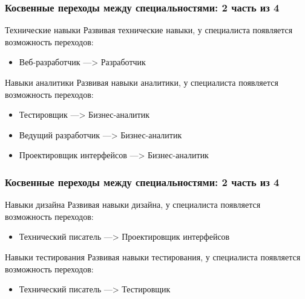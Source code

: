 \documentclass{../industrial-development}
\begin{document}
\begin{frame} \frametitle{Косвенные переходы между специальностями: 2 часть из 4}
 \begin{block}{Технические навыки}
 Развивая \alert{технические навыки}, у специалиста появляется возможность переходов: 
\begin{itemize}
 \item Веб-разработчик ---> Разработчик
\end{itemize}
  \end{block}
  
\begin{block}{Навыки аналитики}
 Развивая \alert{навыки аналитики}, у специалиста появляется возможность переходов: 
\begin{itemize}
 \item Тестировщик ---> Бизнес-аналитик
 \item Ведущий разработчик ---> Бизнес-аналитик
 \item Проектировщик интерфейсов ---> Бизнес-аналитик
\end{itemize}
  \end{block}
\end{frame}


\begin{frame} \frametitle{Косвенные переходы между специальностями: 2 часть из 4}
 \begin{block}{Навыки дизайна}
 Развивая \alert{навыки дизайна}, у специалиста появляется возможность переходов: 
\begin{itemize}
 \item Технический писатель ---> Проектировщик интерфейсов
\end{itemize}
  \end{block}

\begin{block}{Навыки тестирования}
 Развивая \alert{навыки тестирования}, у специалиста появляется возможность переходов: 
\begin{itemize} 
 \item Технический писатель ---> Тестировщик
\end{itemize}
  \end{block}
\end{frame}
\end{document}
